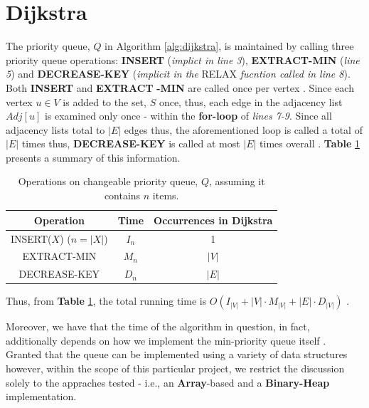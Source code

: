 \documentclass[a4paper, 12pt]{report}
\theoremstyle{definition}
\begin{document}
\section{Dijkstra}
The priority queue, \(Q\) in Algorithm \ref{alg:dijkstra}, is maintained by calling three priority queue operations: \textbf{INSERT} (\emph{implict in line 3}), \textbf{EXTRACT-MIN} (\emph{line 5})
and \textbf{DECREASE-KEY} (\emph{implicit in the} RELAX \emph{fucntion called in line 8}). Both \textbf{INSERT} and \textbf{EXTRACT} \textbf{-MIN} are called once per vertex \cite{cormenBk}. Since each vertex \(u \in V\) is added to the
set, \(S\) once, thus,  each edge in the adjacency list \(Adj[u]\) is examined only once - within the \textbf{for-loop} of \emph{lines 7-9}. Since all adjacency lists total to \(|E|\) edges thus, the aforementioned loop
is called a total of \(|E|\) times thus, \textbf{DECREASE-KEY} is called at most \(|E|\) times overall \cite{cormenBk}.
\textbf{Table} \ref{tab1:dijkstra} presents a summary of this information.
\begin{table}[H]
  \begin{center}
      \begin{tabular}{ |c|c|c| } 
          \hline
          \textbf{Operation} & \textbf{Time} & \textbf{Occurrences in Dijkstra} \\ 
          \hline
          INSERT(\(X\)) (\(n = |X|\)) & \(I_{n}\) & 1\\
          EXTRACT-MIN & $M_{n}$ & $|V|$\\
          DECREASE-KEY & \(D_{n}\) & \(|E|\)\\
          \hline        
      \end{tabular}
  \end{center}
  \caption{Operations on changeable priority queue, \(Q\), assuming it contains \(n\) items. \cite{ocw:2020}}
  \label{tab1:dijkstra}
\end{table}
Thus, from \textbf{Table} \ref{tab1:dijkstra}, the total running time is $O(I_{|V|} + |V| \cdot M_{|V|} + |E| \cdot D_{|V|})$ \cite{ocw:2020}.

Moreover, we have that the time of the algorithm in question, in fact, additionally depends on how we implement the min-priority queue itself \cite{cormenBk,ocw:2020}. 
Granted that the queue can be implemented using a variety of data structures however, within the scope of this particular project, we restrict the 
discussion solely to the appraches tested - i.e., an \textbf{Array}-based and a \textbf{Binary-Heap} implementation. 
\end{document}
